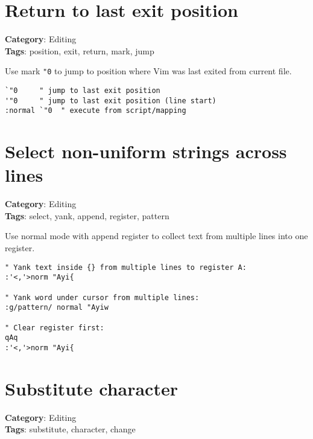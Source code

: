 {{{\section{Return to last exit position}

\textbf{Category}: Editing\\ \textbf{Tags}: position, exit, return, mark, jump
\vspace{0.5cm}

Use mark {\footnotesize \Verb§"0§} to jump to position where Vim was last exited from current file.

\begin{Exa*}{}
\begin{Verbatim}[fontsize=\footnotesize, breaklines, breakanywhere]
`"0     " jump to last exit position
'"0     " jump to last exit position (line start)
:normal `"0  " execute from script/mapping
\end{Verbatim}
\end{Exa*}

\section{Select non-uniform strings across lines}

\textbf{Category}: Editing\\ \textbf{Tags}: select, yank, append, register, pattern
\vspace{0.5cm}

Use normal mode with append register to collect text from multiple lines into one register.

\begin{Exa*}{}
\begin{Verbatim}[fontsize=\footnotesize, breaklines, breakanywhere]
" Yank text inside {} from multiple lines to register A:
:'<,'>norm "Ayi{

" Yank word under cursor from multiple lines:
:g/pattern/ normal "Ayiw

" Clear register first:
qAq
:'<,'>norm "Ayi{
\end{Verbatim}
\end{Exa*}

\section{Substitute character}

\textbf{Category}: Editing\\ \textbf{Tags}: substitute, character, change
\vspace{0.5cm}

}}}
